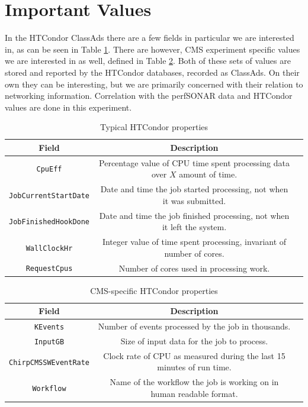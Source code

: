 \documentclass[print,ms]{nuthesis}
\begin{document}
\section{Important Values}
In the HTCondor ClassAds there are a few fields in particular we are interested in, as can be seen in Table \ref{tab:htcondor}. There are however, CMS experiment specific values we are interested in as well, defined in Table \ref{tab:cmscondor}. Both of these sets of values are stored and reported by the HTCondor databases, recorded as ClassAds. On their own they can be interesting, but we are primarily concerned with their relation to networking information. Correlation with the perfSONAR data and HTCondor values are done in this experiment.
\begin{table}
	\caption{Typical HTCondor properties}
	\label{tab:htcondor}
	\begin{tabular}{ccl}
		\toprule
		Field &Description \\
		\midrule
		\texttt{CpuEff} & \parbox{9.5cm}{Percentage value of CPU time spent processing data over $X$ amount of time.} \\
		\midrule
		\texttt{JobCurrentStartDate}& \parbox{9.5cm}{Date and time the job started processing, not when it was submitted.} \\
		\midrule
		\texttt{JobFinishedHookDone}& \parbox{9.5cm}{Date and time the job finished processing, not when it left the system.} \\
		\midrule
		\texttt{WallClockHr}& \parbox{9.5cm}{Integer value of time spent processing, invariant of number of cores.} \\
		\midrule
		\texttt{RequestCpus}& \parbox{9.5cm}{Number of cores used in processing work.} \\
		\bottomrule
	\end{tabular}
\end{table}

\begin{table}
	\caption{CMS-specific HTCondor properties}
	\label{tab:cmscondor}
	\begin{tabular}{ccl}
		\toprule
		Field &Description \\
		\midrule
		\texttt{KEvents} & \parbox{9.5cm}{Number of events processed by the job in thousands.} \\
		\midrule
		\texttt{InputGB}& \parbox{9.5cm}{Size of input data for the job to process.} \\
		\midrule
		\texttt{ChirpCMSSWEventRate}& \parbox{9.5cm}{Clock rate of CPU as measured during the last 15 minutes of run time.} \\
		\midrule
		\texttt{Workflow}& \parbox{9.5cm}{Name of the workflow the job is working on in human readable format.} \\
		\bottomrule
	\end{tabular}
\end{table}
\end{document}

